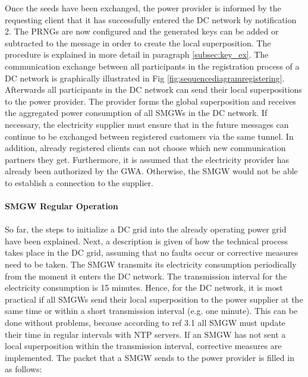 Once the seeds have been exchanged, the power provider is informed by the requesting client that it has successfully entered the DC network by notification 2. The PRNGs are now configured and the generated keys can be added or subtracted to the message in order to create the local superposition. The procedure is explained in more detail in paragraph \ref{subsec:key_ex}.%
The communication exchange between all participants in the registration process of a DC network is graphically illustrated in Fig \ref{fig:sequencediagramregistering}. %
Afterwards all participants in the DC network can send their local superpositions to the power provider. The provider forms the global superposition and receives the aggregated power consumption of all \gls{SMGW}s in the DC network. If necessary, the electricity supplier must ensure that in the future messages can continue to be exchanged between registered customers via the same tunnel. In addition, already registered clients can not choose which new communication partners they get. Furthermore, it is assumed that the electricity provider has already been authorized by the \gls{GWA}. Otherwise, the \gls{SMGW} would not be able to establish a connection to the supplier.\\
\\
\textbf{SMGW Regular Operation}
\\
\\
So far, the steps to initialize a DC grid into the already operating power grid have been explained. Next, a description is given of how the technical process takes place in the DC grid, assuming that no faults occur or corrective measures need to be taken. The \gls{SMGW} transmits its electricity consumption periodically from the moment it enters the DC network. The transmission interval for the electricity consumption is 15 minutes. Hence, for the DC network, it is most practical if all \gls{SMGW}s send their local superposition to the power supplier at the same time or within a short transmission interval (e.g. one minute). This can be done without problems, because according to ref 3.1 all \gls{SMGW} must update their time in regular intervals with NTP servers. If an \gls{SMGW} has not sent a local superposition within the transmission interval, corrective measures are implemented. The packet that a \gls{SMGW} sends to the power provider is filled in as follows:
